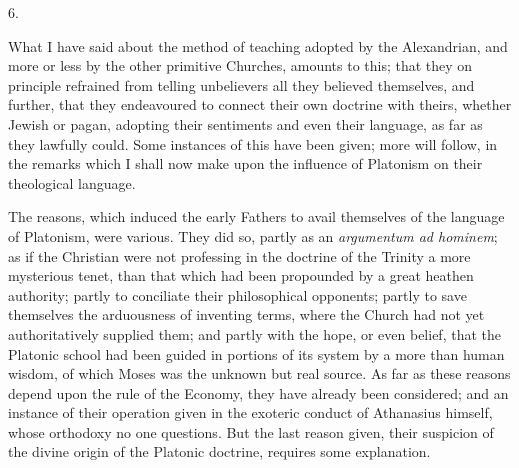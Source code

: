 6.

What I have said about the method of teaching adopted by the
Alexandrian, and more or less by the other primitive Churches, amounts
to this; that they on principle refrained from telling unbelievers all
they believed themselves, and further, that they endeavoured to
connect their own doctrine with theirs, whether Jewish or pagan,
adopting their sentiments and even their language, as far as they
lawfully could. Some instances of this have been given; more will
follow, in the remarks which I shall now make upon the influence of
Platonism on their theological language.

The reasons, which induced the early Fathers to avail themselves of
the language of Platonism, were various. They did so, partly as an \emph{argumentum
ad hominem}; as if the Christian were not professing in the
doctrine of the Trinity a more mysterious tenet, than that which
had been propounded by a great heathen authority; partly to conciliate
their philosophical opponents; partly to save themselves the
arduousness of inventing terms, where the Church had not yet
authoritatively supplied them; and partly with the hope, or even
belief, that the Platonic school had been guided in portions of its
system by a more than human wisdom, of which Moses was the unknown but
real source. As far as these reasons depend upon the rule of the
Economy, they have already been considered; and an instance of their
operation given in the exoteric conduct of Athanasius himself, whose
orthodoxy no one questions. But the last reason given, their suspicion
of the divine origin of the Platonic doctrine, requires some
explanation.

